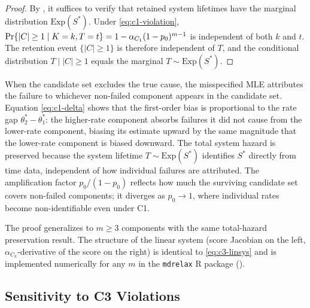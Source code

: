 \begin{proof}
By , it suffices to verify that retained
system lifetimes have the marginal distribution $\mathrm{Exp}(S^*)$.
Under \eqref{eq:c1-violation},
$\mathrm{Pr}\{|C| \geq 1 \mid K = k, T = t\} = 1 - \alpha_{C_1}(1-p_0)^{m-1}$
is independent of both $k$ and $t$. The retention event $\{|C| \geq 1\}$
is therefore independent of $T$, and the conditional distribution
$T \mid |C| \geq 1$ equals the marginal $T \sim \mathrm{Exp}(S^*)$.
\end{proof}

\begin{remark}[Interpretation]
\label{rem:c1-interp}
When the candidate set excludes the true cause, the misspecified MLE
attributes the failure to whichever non-failed component appears in the
candidate set. Equation \eqref{eq:c1-delta} shows that the first-order bias
is proportional to the rate gap $\theta_2^* - \theta_1^*$: the
higher-rate component absorbs failures it did not cause from the
lower-rate component, biasing its estimate upward by the same magnitude
that the lower-rate component is biased downward. The total system hazard
is preserved because the system lifetime $T \sim \mathrm{Exp}(S^*)$
identifies $S^*$ directly from time data, independent of how individual
failures are attributed. The amplification factor $p_0 / (1 - p_0)$
reflects how much the surviving candidate set covers non-failed
components; it diverges as $p_0 \to 1$, where individual rates become
non-identifiable even under C1.
\end{remark}

The proof generalizes to $m \geq 3$ components with the same
total-hazard preservation result. The structure of the linear system
(score Jacobian on the left, $\alpha_{C_k}$-derivative of the score on
the right) is identical to \eqref{eq:c3-linsys} and is implemented
numerically for any $m$ in the \texttt{mdrelax} R package
().

\subsection{Sensitivity to C3 Violations}
\label{sec:c3-sensitivity}

